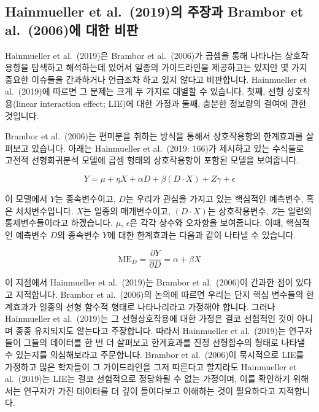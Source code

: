 \documentclass[
]{book}
\begin{document}
\hypertarget{hainmueller-et-al.-2019uxc758-uxc8fcuxc7a5uxacfc-brambor-et-al.-2006uxc5d0-uxb300uxd55c-uxbe44uxd310}{%
\subsection{Hainmueller et al.~(2019)의 주장과 Brambor et al.~(2006)에 대한 비판}\label{hainmueller-et-al.-2019uxc758-uxc8fcuxc7a5uxacfc-brambor-et-al.-2006uxc5d0-uxb300uxd55c-uxbe44uxd310}}

Hainmueller et al.~(2019)은 Brambor et al.~(2006)가 곱셈을 통해 나타나는 상호작용항을 탐색하고 해석하는데 있어서 일종의 가이드라인을 제공하고는 있지만 몇 가지 중요한 이슈들을 간과하거나 언급조차 하고 있지 않다고 비판합니다. Hainmueller et al.~(2019)에 따르면 그 문제는 크게 두 가지로 대별할 수 있습니다. 첫째, 선형 상호작용(linear interaction effect; LIE)에 대한 가정과 둘째, 충분한 정보량의 결여에 관한 것입니다.

Brambor et al.~(2006)는 편미분을 취하는 방식을 통해서 상호작용항의 한계효과를 살펴보고 있습니다. 아래는 Hainmueller et al.~(2019: 166)가 제시하고 있는 수식들로 고전적 선형회귀분석 모델에 곱셈 형태의 상호작용항이 포함된 모델을 보여줍니다.

\begin{equation}
Y = \mu + \eta X + \alpha D + \beta(D\cdot X) + Z\gamma + \epsilon
\end{equation}

이 모델에서 \(Y\)는 종속변수이고, \(D\)는 우리가 관심을 가지고 있는 핵심적인 예측변수, 혹은 처치변수입니다. \(X\)는 일종의 매개변수이고, \((D\cdot X)\)는 상호작용변수, \(Z\)는 일련의 통제변수들이라고 하겠습니다. \(\mu\), \(\epsilon\)은 각각 상수와 오차항을 보여줍니다. 이때, 핵심적인 예측변수 \(D\)의 종속변수 \(Y\)에 대한 한계효과는 다음과 같이 나타낼 수 있습니다.

\begin{equation}
\text{ME}_D = \frac{\partial Y}{\partial D} = \alpha + \beta X
\end{equation}

이 지점에서 Hainmueller et al.~(2019)는 Brambor et al.~(2006)이 간과한 점이 있다고 지적합니다. Brambor et al.~(2006)의 논의에 따르면 우리는 단지 핵심 변수들의 한계효과가 일종의 선형 함수적 형태로 나타나리라고 가정해야 합니다. 그러나 Hainmueller et al.~(2019)는 그 선형상호작용에 대한 가정은 결코 선험적인 것이 아니며 종종 유지되지도 않는다고 주장합니다. 따라서 Hainmueller et al.~(2019)는 연구자들이 그들의 데이터를 한 번 더 살펴보고 한계효과를 진정 선형함수의 형태로 나타낼 수 있는지를 의심해보라고 주문합니다. Brambor et al.~(2006)이 묵시적으로 LIE를 가정하고 많은 학자들이 그 가이드라인을 그저 따른다고 할지라도 Hainmueller et al.~(2019)는 LIE는 결코 선험적으로 정당화될 수 없는 가정이며, 이를 확인하기 위해서는 연구자가 가진 데이터를 더 깊이 들여다보고 이해하는 것이 필요하다고 지적합니다.
\end{document}
